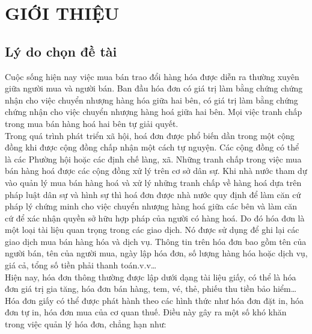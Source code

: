 \section{GIỚI THIỆU}
\subsection{Lý do chọn đề tài}
Cuộc sống hiện nay việc mua bán trao đổi hàng hóa được diễn ra thường xuyên giữa người mua và người bán. Ban đầu hóa đơn có giá trị làm bằng chứng chứng nhận cho việc chuyển nhượng hàng hóa giữa hai bên, có giá trị làm bằng chứng chứng nhận cho việc chuyển nhượng hàng hoá giữa hai bên. Mọi việc tranh chấp trong mua bán hàng hoá hai bên tự giải quyết. \\
\indent Trong quá trình phát triển xã hội, hoá đơn được phổ biến dần trong một cộng đồng khi được cộng đồng chấp nhận một cách tự nguyện. Các cộng đồng có thể là các Phường hội hoặc các định chế làng, xã. Những tranh chấp trong việc mua bán hàng hoá được các cộng đồng xử lý trên cơ sở dân sự. Khi nhà nước tham dự vào quản lý mua bán hàng hoá và xử lý những tranh chấp về hàng hoá dựa trên pháp luật dân sự và hình sự thì hoá đơn được nhà nước quy định để làm căn cứ pháp lý chứng minh cho việc chuyển nhượng hàng hoá giữa các bên và làm căn cứ để xác nhận quyền sở hữu hợp pháp của người có hàng hoá. Do đó hóa đơn là một loại tài liệu quan trọng trong các giao dịch. Nó được sử dụng để ghi lại các giao dịch mua bán hàng hóa và dịch vụ. Thông tin trên hóa đơn bao gồm tên của người bán, tên của người mua, ngày lập hóa đơn, số lượng hàng hóa hoặc dịch vụ, giá cả, tổng số tiền phải thanh toán.v.v\dots \\
\indent Hiện nay, hóa đơn thông thường được lập dưới dạng tài liệu giấy, có thể là hóa đơn giá trị gia tăng, hóa đơn bán hàng, tem, vé, thẻ, phiếu thu tiền bảo hiểm\dots Hóa đơn giấy có thể được phát hành theo các hình thức như hóa đơn đặt in, hóa đơn tự in, hóa đơn mua của cơ quan thuế. Điều này gây ra một số khó khăn trong việc quản lý hóa đơn, chẳng hạn như:
